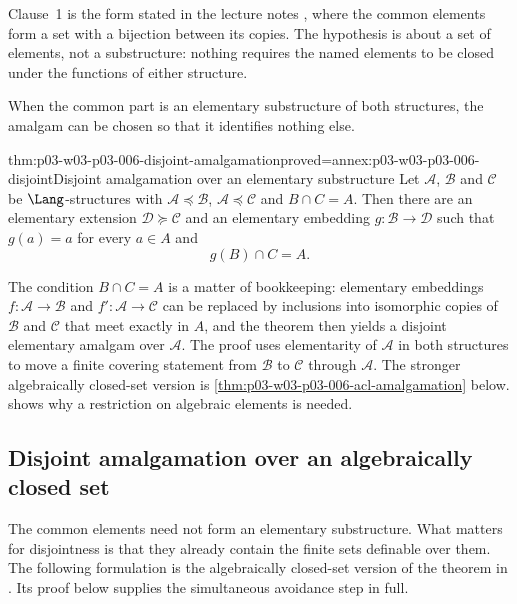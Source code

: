Clause~1 is the form stated in the lecture notes
\cite[Lecture~19, Theorem~1, p.~1]{Speirs2013Amalgamation}, where the
common elements form a set with a bijection between its copies.  The
hypothesis is about a set of elements, not a substructure: nothing requires
the named elements to be closed under the functions of either structure.

When the common part is an elementary substructure of both structures, the
amalgam can be chosen so that it identifies nothing else.

\begin{hbtheorem}{thm:p03-w03-p03-006-disjoint-amalgamation}{proved=annex:p03-w03-p03-006-disjoint}{Disjoint amalgamation over an elementary substructure}
Let \(\mathcal A\), \(\mathcal B\) and \(\mathcal C\) be
\(\Lang\)-structures with \(\mathcal A\preccurlyeq\mathcal B\),
\(\mathcal A\preccurlyeq\mathcal C\) and \(B\cap C=A\).  Then there are an
elementary extension \(\mathcal D\succcurlyeq\mathcal C\) and an elementary
embedding \(g:\mathcal B\to\mathcal D\) such that \(g(a)=a\) for every
\(a\in A\) and
\[
 g(B)\cap C=A.
\]
\end{hbtheorem}

The condition \(B\cap C=A\) is a matter of bookkeeping: elementary
embeddings \(f:\mathcal A\to\mathcal B\) and \(f':\mathcal A\to\mathcal C\)
can be replaced by inclusions into isomorphic copies of \(\mathcal B\) and
\(\mathcal C\) that meet exactly in \(A\), and the theorem then yields a
disjoint elementary amalgam over \(\mathcal A\).
The proof uses elementarity of \(\mathcal A\) in both structures to move a
finite covering statement from \(\mathcal B\) to \(\mathcal C\) through
\(\mathcal A\). The stronger algebraically closed-set version is
\cref{thm:p03-w03-p03-006-acl-amalgamation} below.
 shows why a restriction on
algebraic elements is needed.

\subsection{Disjoint amalgamation over an algebraically closed set}
\label{sec:p03-w03-p03-006-algebraically-closed}

The common elements need not form an elementary substructure. What matters
for disjointness is that they already contain the finite sets definable
over them. The following formulation is the algebraically closed-set
version of the theorem in
\cite[Lecture~19, Theorem~2, pp.~3--5]{Speirs2013Amalgamation}. Its proof
below supplies the simultaneous avoidance step in full.

